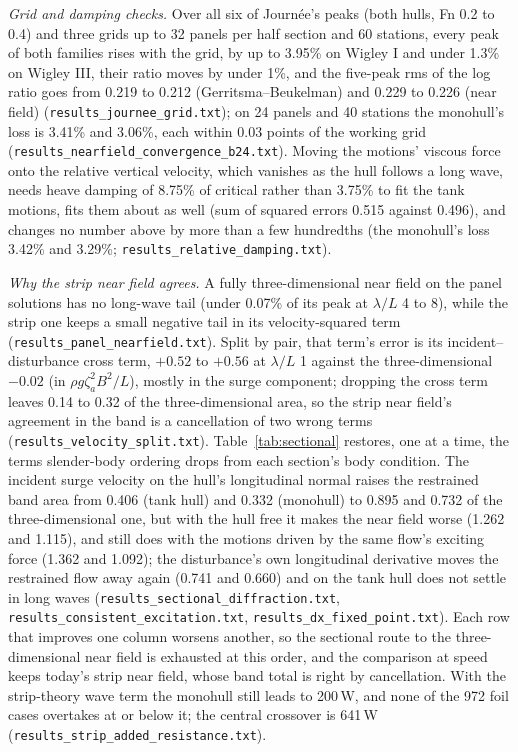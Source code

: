 \documentclass[conference]{IEEEtran}
\begin{document}
\emph{Grid and damping checks.} Over all six of Journ\'ee's peaks (both hulls, Fn 0.2 to 0.4) and three grids up to 32 panels per half section and 60 stations, every peak of both families rises with the grid, by up to 3.95\% on Wigley I and under 1.3\% on Wigley III, their ratio moves by under 1\%, and the five-peak rms of the log ratio goes from 0.219 to 0.212 (Gerritsma--Beukelman) and 0.229 to 0.226 (near field) (\texttt{results\_journee\_grid.txt}); on 24 panels and 40 stations the monohull's loss is 3.41\% and 3.06\%, each within 0.03 points of the working grid (\texttt{results\_nearfield\_convergence\_b24.txt}). Moving the motions' viscous force onto the relative vertical velocity, which vanishes as the hull follows a long wave, needs heave damping of 8.75\% of critical rather than 3.75\% to fit the tank motions, fits them about as well (sum of squared errors 0.515 against 0.496), and changes no number above by more than a few hundredths (the monohull's loss 3.42\% and 3.29\%; \texttt{results\_relative\_damping.txt}).

\emph{Why the strip near field agrees.} A fully three-dimensional near field on the panel solutions has no long-wave tail (under 0.07\% of its peak at $\lambda/L$ 4 to 8), while the strip one keeps a small negative tail in its velocity-squared term (\texttt{results\_panel\_nearfield.txt}). Split by pair, that term's error is its incident--disturbance cross term, $+0.52$ to $+0.56$ at $\lambda/L$ 1 against the three-dimensional $-0.02$ (in $\rho g\zeta_a^2B^2/L$), mostly in the surge component; dropping the cross term leaves 0.14 to 0.32 of the three-dimensional area, so the strip near field's agreement in the band is a cancellation of two wrong terms (\texttt{results\_velocity\_split.txt}). Table~\ref{tab:sectional} restores, one at a time, the terms slender-body ordering drops from each section's body condition. The incident surge velocity on the hull's longitudinal normal raises the restrained band area from 0.406 (tank hull) and 0.332 (monohull) to 0.895 and 0.732 of the three-dimensional one, but with the hull free it makes the near field worse (1.262 and 1.115), and still does with the motions driven by the same flow's exciting force (1.362 and 1.092); the disturbance's own longitudinal derivative moves the restrained flow away again (0.741 and 0.660) and on the tank hull does not settle in long waves (\texttt{results\_sectional\_diffraction.txt}, \texttt{results\_consistent\_excitation.txt}, \texttt{results\_dx\_fixed\_point.txt}). Each row that improves one column worsens another, so the sectional route to the three-dimensional near field is exhausted at this order, and the comparison at speed keeps today's strip near field, whose band total is right by cancellation. With the strip-theory wave term the monohull still leads to 200\,W, and none of the 972 foil cases overtakes at or below it; the central crossover is 641\,W (\texttt{results\_strip\_added\_resistance.txt}).
\end{document}
